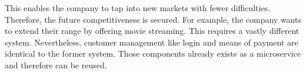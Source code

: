 This enables the company to tap into new markets with fewer difficulties. 
Therefore, the future competitiveness is secured. 
For example, the \CoCoME company wants to extend their  range by offering movie streaming.%
This requires a vastly different system. 
Nevertheless, customer management like login and means of payment are identical to the former \CoCoME system. 
Those components already exists as a microservice and therefore can be reused. 








	
	
